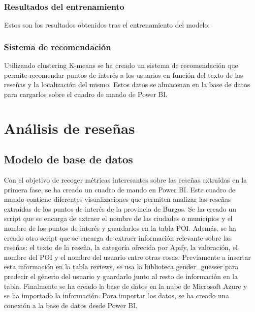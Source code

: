 \subsubsection{Resultados del entrenamiento}

Estos son los resultados obtenidos tras el entrenamiento del modelo:


\subsubsection{Sistema de recomendación}

Utilizando clustering K-means se ha creado un sistema de recomendación que permite recomendar puntos de interés a los usuarios en función del texto de las reseñas y la localización del mismo.
Estos datos se almacenan en la base de datos para cargarlos sobre el cuadro de mando de Power BI.

\section{Análisis de reseñas}

\subsection{Modelo de base de datos}

Con el objetivo de recoger métricas interesantes sobre las reseñas extraídas en la primera fase, se ha creado un cuadro de mando en Power BI.
Este cuadro de mando contiene diferentes visualizaciones que permiten analizar las reseñas extraídas de los puntos de interés de la provincia de Burgos.
Se ha creado un script que se encarga de extraer el nombre de las ciudades o municipios y el nombre de los puntos de interés y guardarlos en la tabla POI.
Además, se ha creado otro script que se encarga de extraer información relevante sobre las reseñas: el texto de la reseña, la categoría ofrecida por Apify, la valoración, el nombre del POI y el nombre del usuario entre otras cosas.
Previamente a insertar esta información en la tabla reviews, se usa la biblioteca gender\_guesser para predecir el génerio del usuario y guardarlo junto al resto de información en la tabla.
Finalmente se ha creado la base de datos en la nube de Microsoft Azure y se ha importado la información.
Para importar los datos, se ha creado una conexión a la base de datos desde Power BI.


